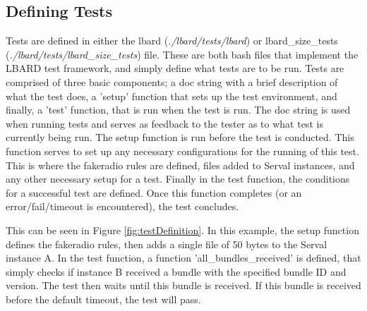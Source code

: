 \subsection{Defining Tests}
Tests are defined in either the lbard (\emph{./lbard/tests/lbard}) or lbard\_size\_tests (\emph{./lbard/tests/lbard\_size\_tests}) file. 
These are both bash files that implement the LBARD test framework, and simply define what tests are to be run.
Tests are comprised of three basic components; a doc string with a brief description of what the test does, a 'setup' function that sets up the test environment, and finally, a 'test' function, that is run when the test is run.
The doc string is used when running tests and serves as feedback to the tester as to what test is currently being run.
The setup function is run before the test is conducted. This function serves to set up any necessary configurations for the running of this test. This is where the fakeradio rules are defined, files added to Serval instances, and any other necessary setup for a test.
Finally in the test function, the conditions for a successful test are defined. Once this function completes (or an error/fail/timeout is encountered), the test concludes.


This can be seen in Figure \ref{fig:testDefinition}. 
In this example, the setup function defines the fakeradio rules, then adds a single file of 50 bytes to the Serval instance A. 
In the test function, a function 'all\_bundles\_received' is defined, that simply checks if instance B received a bundle with the specified bundle ID and version. 
The test then waits until this bundle is received. 
If this bundle is received before the default timeout, the test will pass.

